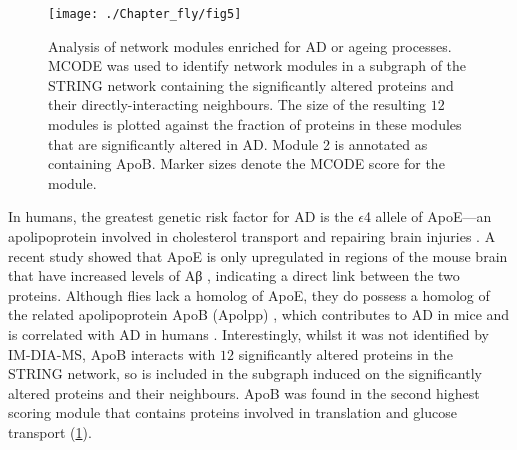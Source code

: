 \begin{figure}[!hbt]
    \centering
    \texttt{[image: ./Chapter\_fly/fig5]}
    \caption{%
        Analysis of network modules enriched for AD or ageing processes.
        MCODE was used to identify network modules in a subgraph of the STRING network
        containing the significantly altered proteins and their directly-interacting neighbours.
        The size of the resulting $12$ modules is plotted against the fraction of proteins
        in these modules that are significantly altered in AD.
        Module 2 is annotated as containing ApoB.
        Marker sizes denote the MCODE score for the module.
    }
    \label{fig:fly-fig5}
\end{figure}


In humans, the greatest genetic risk factor for AD is the $\epsilon$4 allele of ApoE---an
apolipoprotein involved in cholesterol transport and repairing brain injuries \cite{Liu2013b}.
A recent study showed that ApoE is only upregulated in regions of the mouse brain
that have increased levels of Aβ \cite{Savas2017},
indicating a direct link between the two proteins.
Although flies lack a homolog of ApoE, they do possess a homolog of the related
apolipoprotein ApoB (Apolpp) \cite{Palm2012}, which contributes to AD in mice \cite{Bereczki2008,Loffler2013}
and is correlated with AD in humans \cite{Caramelli1999,Zhang2004}.
Interestingly, whilst it was not identified by IM-DIA-MS,
ApoB interacts with $12$ significantly altered proteins in the STRING network,
so is included in the subgraph induced on the significantly altered proteins
and their neighbours.
ApoB was found in the second highest scoring module that contains proteins involved in
translation and glucose transport \cite{Niccoli2016} (\ref{fig:fly-fig5}).

